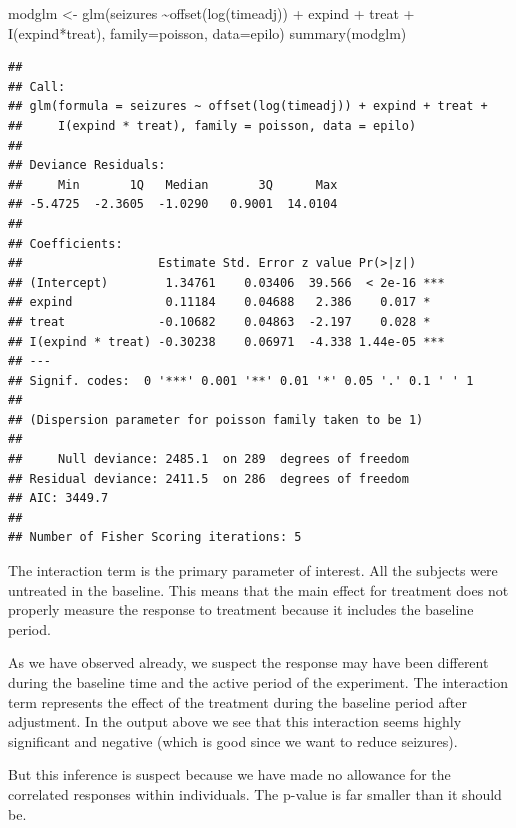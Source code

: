 \documentclass[
  ignorenonframetext,
]{beamer}
\newenvironment{Shaded}{\begin{snugshade}}{\end{snugshade}}
\newcommand{\AttributeTok}[1]{\textcolor[rgb]{0.77,0.63,0.00}{#1}}
\newcommand{\FunctionTok}[1]{\textcolor[rgb]{0.00,0.00,0.00}{#1}}
\newcommand{\NormalTok}[1]{#1}
\newcommand{\OtherTok}[1]{\textcolor[rgb]{0.56,0.35,0.01}{#1}}
\newcommand{\SpecialCharTok}[1]{\textcolor[rgb]{0.00,0.00,0.00}{#1}}
\begin{document}
\begin{frame}[fragile]{}
\protect\hypertarget{section-7}{}
\tiny

\begin{Shaded}
\begin{Highlighting}[]
\NormalTok{modglm }\OtherTok{\textless{}{-}} \FunctionTok{glm}\NormalTok{(seizures }\SpecialCharTok{\textasciitilde{}}\FunctionTok{offset}\NormalTok{(}\FunctionTok{log}\NormalTok{(timeadj)) }\SpecialCharTok{+}\NormalTok{ expind }\SpecialCharTok{+}\NormalTok{ treat }\SpecialCharTok{+} 
  \FunctionTok{I}\NormalTok{(expind}\SpecialCharTok{*}\NormalTok{treat), }\AttributeTok{family=}\NormalTok{poisson, }\AttributeTok{data=}\NormalTok{epilo)}
\FunctionTok{summary}\NormalTok{(modglm)}
\end{Highlighting}
\end{Shaded}

\begin{verbatim}
## 
## Call:
## glm(formula = seizures ~ offset(log(timeadj)) + expind + treat + 
##     I(expind * treat), family = poisson, data = epilo)
## 
## Deviance Residuals: 
##     Min       1Q   Median       3Q      Max  
## -5.4725  -2.3605  -1.0290   0.9001  14.0104  
## 
## Coefficients:
##                   Estimate Std. Error z value Pr(>|z|)    
## (Intercept)        1.34761    0.03406  39.566  < 2e-16 ***
## expind             0.11184    0.04688   2.386    0.017 *  
## treat             -0.10682    0.04863  -2.197    0.028 *  
## I(expind * treat) -0.30238    0.06971  -4.338 1.44e-05 ***
## ---
## Signif. codes:  0 '***' 0.001 '**' 0.01 '*' 0.05 '.' 0.1 ' ' 1
## 
## (Dispersion parameter for poisson family taken to be 1)
## 
##     Null deviance: 2485.1  on 289  degrees of freedom
## Residual deviance: 2411.5  on 286  degrees of freedom
## AIC: 3449.7
## 
## Number of Fisher Scoring iterations: 5
\end{verbatim}
\end{frame}

\begin{frame}{}
\protect\hypertarget{section-8}{}
The interaction term is the primary parameter of interest. All the
subjects were untreated in the baseline. This means that the main effect
for treatment does not properly measure the response to treatment
because it includes the baseline period.

As we have observed already, we suspect the response may have been
different during the baseline time and the active period of the
experiment. The interaction term represents the effect of the treatment
during the baseline period after adjustment. In the output above we see
that this interaction seems highly significant and negative (which is
good since we want to reduce seizures).

But this inference is suspect because we have made no allowance for the
correlated responses within individuals. The p-value is far smaller than
it should be.
\end{frame}
\end{document}
